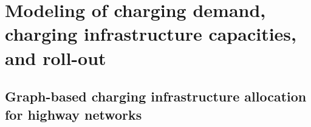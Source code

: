             
        
    \section{Modeling of charging demand, charging infrastructure capacities, and roll-out} \label{sec:lit_3}
        \subsection{Graph-based charging infrastructure allocation for highway networks}
        
